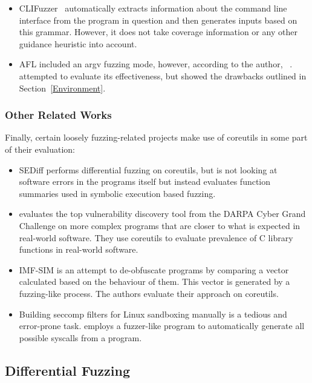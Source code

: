 \documentclass{article}
\let\savedCite=\cite
\renewcommand{\cite}{\unskip~\savedCite}
\begin{document}
\begin{multicols}{2}
    \begin{itemize}
        \item CLIFuzzer\cite{CLIFuzzer} automatically extracts information about the command line interface from the program in question and then generates inputs based on this grammar. However, it does not take coverage information or any other guidance heuristic into account.
        \item AFL included an argv fuzzing mode, however, according to the author, \cite{AFLPlusPlusargv}. \citeauthor{AFLCoreutils} attempted to evaluate its effectiveness, but showed the drawbacks outlined in Section~\ref{Environment}.\cite{AFLCoreutils}
    \end{itemize}

    \subsubsection{Other Related Works}

    Finally, certain loosely fuzzing-related projects make use of coreutils in some part of their evaluation:

    \begin{itemize}
        \item SEDiff performs differential fuzzing on coreutils, but is not looking at software errors in the programs itself but instead evaluates function summaries used in symbolic execution based fuzzing.\cite{SEDiff}
        \item \citeauthor{DarpaExtended} evaluates the top vulnerability discovery tool from the DARPA Cyber Grand Challenge on more complex programs that are closer to what is expected in real-world software. They use coreutils to evaluate prevalence of C library functions in real-world software.\cite{DarpaExtended}
        \item IMF-SIM is an attempt to de-obfuscate programs by comparing a vector calculated based on the behaviour of them. This vector is generated by a fuzzing-like process. The authors evaluate their approach on coreutils.\cite{IMF-SIM}
        \item Building seccomp filters for Linux sandboxing manually is a tedious and error-prone task. \citeauthor{Seccomp} employs a fuzzer-like program to automatically generate all possible syscalls from a program.\cite{Seccomp}
    \end{itemize}

    \subsection{Differential Fuzzing}


\end{multicols}
\end{document}
